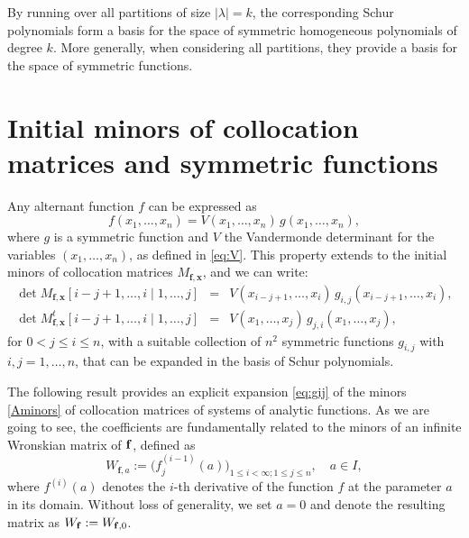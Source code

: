 \documentclass[smallextended]{svjour3}       %
\begin{document}
By running over all partitions of size \( |\lambda| = k \), the corresponding Schur polynomials form a basis for the space of symmetric homogeneous polynomials of degree \( k \). More generally, when considering all partitions, they provide a basis for the space of symmetric functions.

  




 
 






   
\section{Initial minors of collocation matrices and symmetric functions} \label{sec:BD_factor} 


Any alternant function  \( f  \)  can be expressed as  
\[ 
    f(x_1,\dots,x_n) = V(x_1, \ldots, x_n) \, g(x_1,\dots,x_n),
\] 
where \( g  \)  is a symmetric function and $V $ the Vandermonde determinant for the variables \((x_1,\ldots,x_n)\), as defined  in  \eqref{eq:V}.
This property extends to the initial minors of collocation matrices \( M_{\mathbf{f}, \mathbf{x}}   \), and we can write:  
\begin{eqnarray} \label{eq:gij}
 \det  M_{\mathbf{f}, \mathbf{x}}[i-j+1, \dots, i \mid 1, \dots, j] &=& V(x_{i-j+1}, \ldots, x_i) \, g_{i,j}(x_{i-j+1},\dots,x_i), \nonumber \\
  \det  M_{\mathbf{f}, \mathbf{x}}^t [i-j+1, \dots, i \mid 1, \dots, j] &=& V(x_1, \ldots, x_j) \, g_{j,i}(x_1,\dots,x_j),   
\end{eqnarray} 
for   $0 < j \le i \leq n$, with a suitable collection of \( n^2 \) symmetric functions \( g_{i,j} \) with \(i,j=1,\dots,n \), that can be expanded in the basis of Schur polynomials. 

The following result provides an explicit expansion \eqref{eq:gij} of the minors \eqref{Aminors} of collocation matrices of systems of analytic functions.  
As we are going to see, the coefficients  are fundamentally related to the minors of an infinite Wronskian matrix of   \( {\bf f} \), defined as  
\begin{equation}\label{extendedW}
       W_{{\mathbf f},  a}:=\big(f_j^{(i-1)}(a)\big)_{1 \le i < \infty; 1\le j \le n},\quad a\in I, 
\end{equation} 
where \(f ^{(i)}(a)\) denotes the $i$-th derivative of the function $f$ at the parameter $a$ in its domain. 
Without loss of generality, we set \( a = 0 \) and denote the resulting matrix as \( W_{\bf f} := W_{{\mathbf f},  0}  \).  
\end{document}

